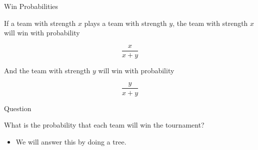 \documentclass[
  ignorenonframetext,
]{beamer}
\providecommand{\tightlist}{%
  \setlength{\itemsep}{0pt}\setlength{\parskip}{0pt}}
\renewcommand{\,}{\text{, }}
\begin{document}
\begin{frame}{Win Probabilities}
\protect\hypertarget{win-probabilities}{}

If a team with strength \(x\) plays a team with strength \(y\), the team
with strength \(x\) will win with probability

\[
\frac{x}{x+ y}
\]

\bigskip

And the team with strength \(y\) will win with probability

\[
\frac{y}{x + y}
\]

\end{frame}

\begin{frame}{Question}
\protect\hypertarget{question}{}

What is the probability that each team will win the tournament?

\begin{itemize}[<+->]
\tightlist
\item
  We will answer this by doing a tree.
\end{itemize}

\end{frame}
\end{document}
